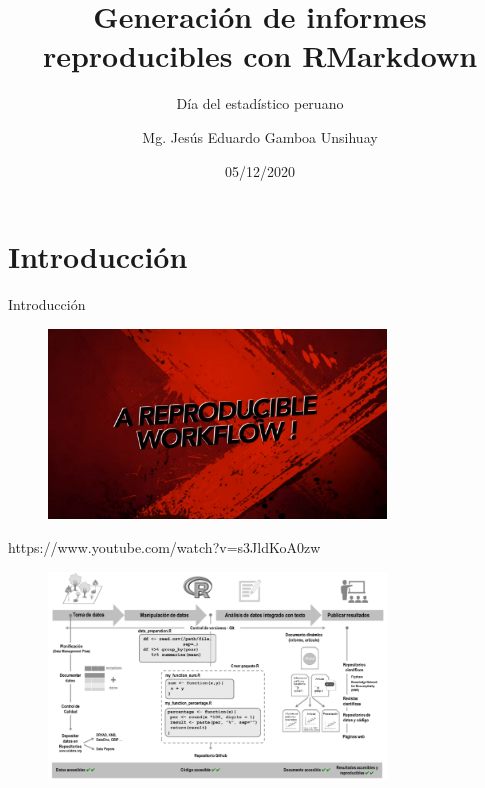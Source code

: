 \documentclass[
  ignorenonframetext,
  aspectratio=169]{beamer}
\title{Generación de informes reproducibles con RMarkdown}
\subtitle{Día del estadístico peruano}
\author{Mg. Jesús Eduardo Gamboa Unsihuay}
\date{05/12/2020}
\begin{document}
\frame{\titlepage}

\begin{frame}
  \tableofcontents[hideallsubsections]
\end{frame}
\hypertarget{introducciuxf3n}{%
\section{Introducción}\label{introducciuxf3n}}

\begin{frame}{Introducción}

\begin{figure}
\includegraphics[width=0.8\textwidth]{reproducible.jpg}
\end{figure}

\begin{center}
https://www.youtube.com/watch?v=s3JldKoA0zw
\end{center}

\end{frame}

\begin{frame}

\begin{figure}
\includegraphics[width=0.8\textwidth]{flujo.png}
\end{figure}

\end{frame}
\end{document}
